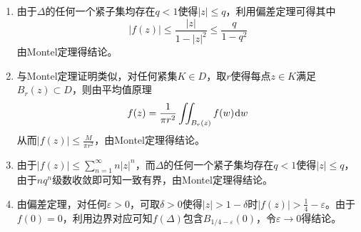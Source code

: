 \documentclass[a4paper,UTF8,fontset=windows,10pt]{ctexart}
\newcommand*{\dr}{\hspace{0.07em}\mathrm{d}}
\begin{document}
\begin{enumerate}
    \item 由于$\Delta$的任何一个紧子集均存在$q<1$使得$|z|\le q$，利用偏差定理可得其中
    $$|f(z)|\le\frac{|z|}{1-|z|^2}\le\frac{q}{1-q^2}$$
    由Montel定理得结论。

    \item 与Montel定理证明类似，对任何紧集$K\in D$，取$r$使得每点$z\in K$满足$B_r(z)\subset D$，则由平均值原理
    $$f(z)=\frac{1}{\pi r^2}\iint_{B_r(z)}f(w)\dr w$$
    从而$|f(z)|\le\frac{M}{\pi r^2}$，由Montel定理得结论。

    \item 由于$|f(z)|\le\sum_{n=1}^\infty n|z|^n$，而$\Delta$的任何一个紧子集均存在$q<1$使得$|z|\le q$，由于$nq^n$级数收敛即可知一致有界，由Montel定理得结论。
    
    \item 由偏差定理，对任何$\varepsilon>0$，可取$\delta>0$使得$|z|> 1-\delta$时$|f(z)|>\frac{1}{4}-\varepsilon$。由于$f(0)=0$，利用边界对应可知$f(\Delta)$包含$B_{1/4-\varepsilon}(0)$，令$\varepsilon\to0$得结论。
\end{enumerate}
\end{document}
